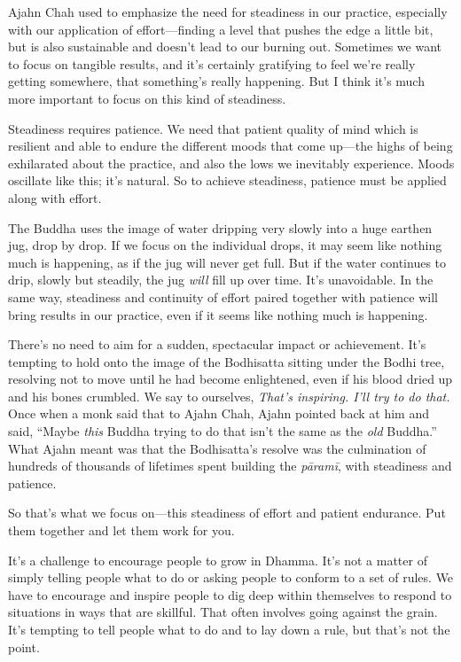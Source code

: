 
Ajahn Chah used to emphasize the need for steadiness in our practice, 
especially with our application of effort---finding a level that pushes 
the edge a little bit, but is also sustainable and doesn't lead to our 
burning out. Sometimes we want to focus on tangible results, and it's 
certainly gratifying to feel we're really getting somewhere, that 
something's really happening. But I think it's much more important to 
focus on this kind of steadiness.

Steadiness requires patience. We need that patient quality of mind 
which is resilient and able to endure the different moods that come 
up---the highs of being exhilarated about the practice, and also the 
lows we inevitably experience. Moods oscillate like this; it's natural. 
So to achieve steadiness, patience must be applied along with effort.

The Buddha uses the image of water dripping very slowly into a huge 
earthen jug, drop by drop. If we focus on the individual drops, it may 
seem like nothing much is happening, as if the jug will never get full. 
But if the water continues to drip, slowly but steadily, the jug 
\emph{will} fill up over time. It's unavoidable. In the same way, 
steadiness and continuity of effort paired together with patience will 
bring results in our practice, even if it seems like nothing much is 
happening.

There's no need to aim for a sudden, spectacular impact or achievement. 
It's tempting to hold onto the image of the Bodhisatta sitting under 
the Bodhi tree, resolving not to move until he had become enlightened, 
even if his blood dried up and his bones crumbled. We say to ourselves, 
\emph{That's inspiring. I'll try to do that.} Once when a monk said 
that to Ajahn Chah, Ajahn pointed back at him and said, ``Maybe 
\emph{this} Buddha trying to do that isn't the same as the \emph{old} 
Buddha.'' What Ajahn meant was that the Bodhisatta's resolve was the 
culmination of hundreds of thousands of lifetimes spent building the 
\emph{pāramī}, with steadiness and patience.

So that's what we focus on---this steadiness of effort and patient 
endurance. Put them together and let them work for you.


It's a challenge to encourage people to grow in Dhamma. It's not a 
matter of simply telling people what to do or asking people to conform 
to a set of rules. We have to encourage and inspire people to dig deep 
within themselves to respond to situations in ways that are skillful. 
That often involves going against the grain. It's tempting to tell 
people what to do and to lay down a rule, but that's not the point.

